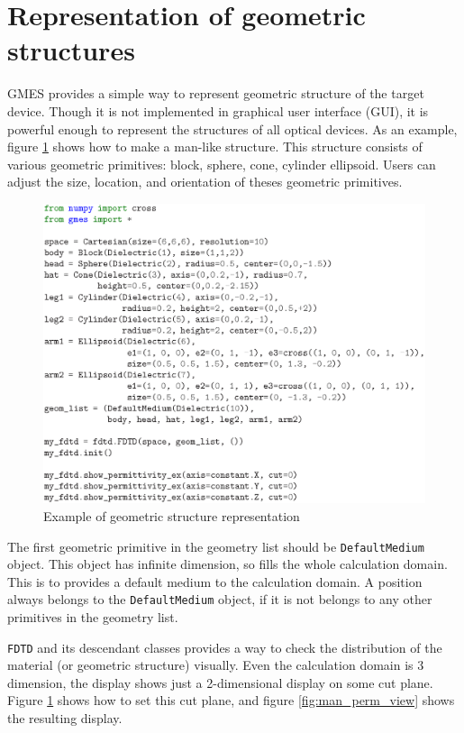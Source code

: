 \section{Representation of geometric structures}
GMES provides a simple way to represent geometric structure of the target device. Though it is not implemented in graphical user interface (GUI), it is powerful enough to represent the structures of all optical devices. As an example, figure \ref{fig:man_code} shows how to make a man-like structure. This structure consists of various geometric primitives: block, sphere, cone, cylinder ellipsoid. Users can adjust the size, location, and orientation of theses geometric primitives.

\begin{figure}[hp!]
  \centering
  \includegraphics{figure/man}
  \caption{Example of geometric structure representation}
  \label{fig:man_code}
\end{figure}

The first geometric primitive in the geometry list should be \texttt{DefaultMedium} object. This object has infinite dimension, so fills the whole calculation domain. This is to provides a default medium to the calculation domain. A position always belongs to the \texttt{DefaultMedium} object, if it is not belongs to any other primitives in the geometry list.

\texttt{FDTD} and its descendant classes provides a way to check the distribution of the material (or geometric structure) visually. Even the calculation domain is 3 dimension, the display shows just a 2-dimensional display on some cut plane. Figure \ref{fig:man_code} shows how to set this cut plane, and figure \ref{fig:man_perm_view} shows the resulting display.


